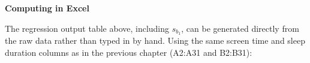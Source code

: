 %
%


\textbf{Computing in Excel}

The regression output table above, including $s_{b_1}$, can be generated directly from the raw data rather than typed in by hand. Using the same screen time and sleep duration columns as in the previous chapter (A2:A31 and B2:B31):

